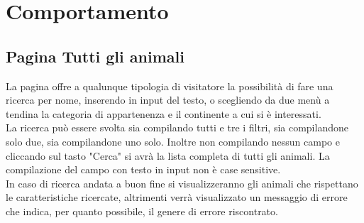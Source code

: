 \section{Comportamento}

\subsection{Pagina Tutti gli animali}
La pagina offre a qualunque tipologia di visitatore la possibilità di fare una ricerca per nome, inserendo in input del testo, o scegliendo da due menù a tendina la categoria di appartenenza e il continente a cui si è interessati.\\
La ricerca può essere svolta sia compilando tutti e tre i filtri, sia compilandone solo due, sia compilandone uno solo. Inoltre non compilando nessun campo e cliccando sul tasto "Cerca" si avrà la lista completa di tutti gli animali. La compilazione del campo con testo in input non è case sensitive.\\
In caso di ricerca andata a buon fine si visualizzeranno gli animali che rispettano le caratteristiche ricercate, altrimenti verrà visualizzato un messaggio di errore che indica, per quanto possibile, il genere di errore riscontrato.
\pagebreak